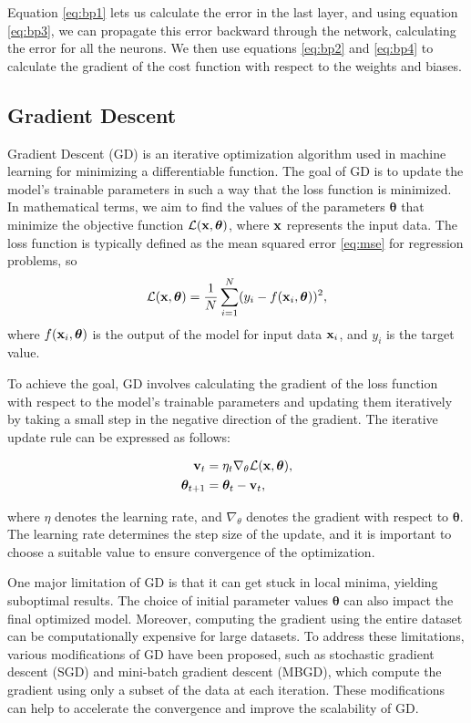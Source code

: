Equation \eqref{eq:bp1} lets us calculate the error in the last layer, and using equation \eqref{eq:bp3}, we can propagate this error backward through the network, calculating the error for all the neurons.
We then use equations \eqref{eq:bp2} and \eqref{eq:bp4} to calculate the gradient of the cost function with respect to the weights and biases.


\subsection{Gradient Descent}
Gradient Descent (GD) is an iterative optimization algorithm used in machine learning for minimizing a differentiable function.
The goal of GD is to update the model's trainable parameters in such a way that the loss function is minimized.
In mathematical terms, we aim to find the values of the parameters $\boldsymbol{\theta}$ that minimize the objective function $\mathcal{L}(\bold{x}, \boldsymbol{\theta})$, where $\bold{x}$ represents the input data.
The loss function is typically defined as the mean squared error \eqref{eq:mse} for regression problems, so
\begin{equation}
    \mathcal{L}(\bold{x}, \boldsymbol{\theta}) = \frac{1}{N}\sum_{i=1}^N(y_i-f(\bold{x}_i, \boldsymbol{\theta}))^2,
\end{equation}
where $f(\bold{x}_i, \boldsymbol{\theta})$ is the output of the model for input data $\bold{x}_i$, and $y_i$ is the target value.

To achieve the goal, GD involves calculating the gradient of the loss function with respect to the model's trainable parameters and updating them iteratively by taking a small step in the negative direction of the gradient.
The iterative update rule can be expressed as follows:

\begin{align}
\bold{v}_t &= \eta_t \nabla_\theta \mathcal{L}(\bold{x}, \boldsymbol{\theta}), \\
\boldsymbol{\theta}_{t+1} &= \boldsymbol{\theta}_t - \bold{v}_t,
\end{align}

where $\eta$ denotes the learning rate, and $\nabla_\theta$ denotes the gradient with respect to $\boldsymbol{\theta}$.
The learning rate determines the step size of the update, and it is important to choose a suitable value to ensure convergence of the optimization.

One major limitation of GD is that it can get stuck in local minima, yielding suboptimal results.
The choice of initial parameter values $\boldsymbol{\theta}$ can also impact the final optimized model.
Moreover, computing the gradient using the entire dataset can be computationally expensive for large datasets.
To address these limitations, various modifications of GD have been proposed,
such as stochastic gradient descent (SGD) and mini-batch gradient descent (MBGD),
which compute the gradient using only a subset of the data at each iteration.
These modifications can help to accelerate the convergence and improve the scalability of GD.

